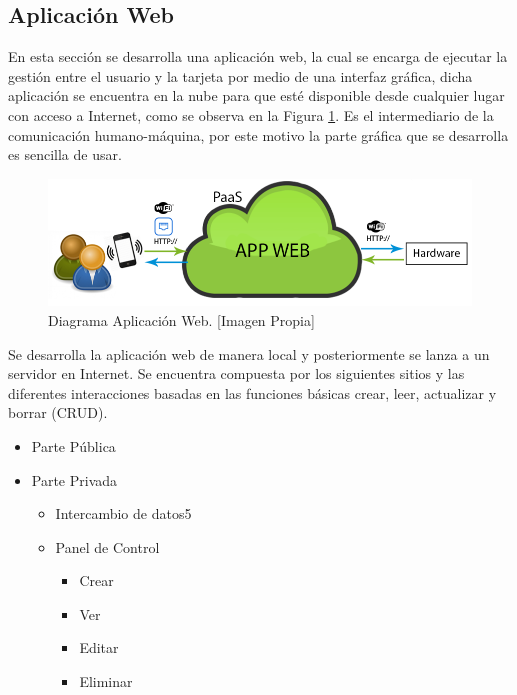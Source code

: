 
\subsection{Aplicación Web}

En esta sección se desarrolla una aplicación web, la cual se encarga de ejecutar la gestión entre el usuario y la tarjeta por medio de una interfaz gráfica, dicha aplicación se encuentra en la nube para que esté disponible desde cualquier lugar con acceso a Internet, como se observa en la Figura \ref{fig:B_appwD}. Es el intermediario de la comunicación humano-máquina, por este motivo la parte gráfica que se desarrolla es sencilla de usar.\\

\begin{figure}[H]
	\centering
	\caption[Diagrama Aplicación Web.]{Diagrama Aplicación Web. [Imagen Propia]}
	\label{fig:B_appwD}
	\includegraphics[width=0.7\linewidth]{Imagenes/B_AppWebDllo}
\end{figure}

Se desarrolla la aplicación web de manera local y posteriormente se lanza a un servidor en Internet. Se encuentra compuesta por los siguientes sitios y las diferentes interacciones basadas en las funciones básicas crear, leer, actualizar y borrar (CRUD).\\

\begin{itemize}
	\item Parte Pública
	\item Parte Privada
	\begin{itemize}
		\item Intercambio de datos5
		\item Panel de Control
		\begin{itemize}
			\item Crear
			\item Ver
			\item Editar
			\item Eliminar 
		\end{itemize}
	\end{itemize}
\end{itemize}

